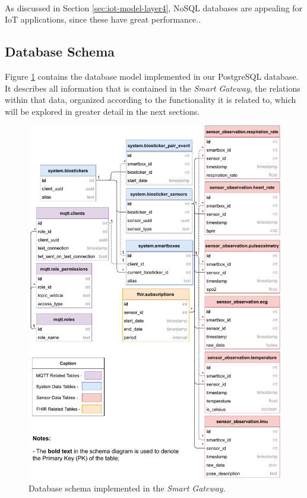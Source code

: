 \paragraph{} As discussed in Section \ref{sec:iot-model-layer4}, No\acs{SQL} databases are appealing for \acs{IoT} applications, since these have great performance..



\subsection{Database Schema}
Figure \ref{fig:wow-dbschema-full} contains the database model implemented in our PostgreSQL database. It describes all information that is contained in the \textit{Smart Gateway}, the relations within that data, organized according to the functionality it is related to, which will be explored in greater detail in the next sections.


\begin{figure}[H]
    \centering
    \includegraphics[width=0.86\linewidth]{images/database-schema-general.pdf}
    \caption[Database schema implemented in the \textit{Smart Gateway}.]{Database schema implemented in the \textit{Smart Gateway}.}
    \label{fig:wow-dbschema-full}
\end{figure}

